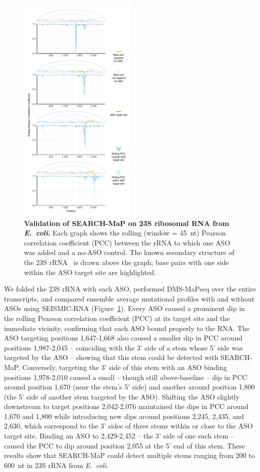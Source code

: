 \documentclass[main.tex]{subfiles}
\begin{document}
\begin{figure}[H]
	\includegraphics[width=0.5\textwidth]{../MainFigures/rrna/rrna.pdf}
	\caption{\textbf{Validation of SEARCH-MaP on 23S ribosomal RNA from \textit{E.~coli}.} Each graph shows the rolling (window = 45~nt) Pearson correlation coefficient (PCC) between the rRNA to which one ASO was added and a no-ASO control. The known secondary structure of the 23S rRNA~\cite{Cannone2002} is drawn above the graph; base pairs with one side within the ASO target site are highlighted.}
	\label{rrna}
\end{figure}

We folded the 23S rRNA with each ASO, performed DMS-MaPseq over the entire transcripts, and compared ensemble average mutational profiles with and without ASOs using SEISMIC-RNA (Figure~\ref{rrna}).
Every ASO caused a prominent dip in the rolling Pearson correlation coefficient (PCC) at its target site and the immediate vicinity, confirming that each ASO bound properly to the RNA.
The ASO targeting positions 1,647-1,668 also caused a smaller dip in PCC around positions 1,987-2,045 -- coinciding with the 3' side of a stem whose 5' side was targeted by the ASO -- showing that this stem could be detected with SEARCH-MaP.
Conversely, targeting the 3' side of this stem with an ASO binding positions 1,978-2,010 caused a small -- though still above-baseline -- dip in PCC around position 1,670 (near the stem's 5' side) and another around position 1,800 (the 5' side of another stem targeted by the ASO).
Shifting the ASO slightly downstream to target positions 2,042-2,076 maintained the dips in PCC around 1,670 and 1,800 while introducing new dips around positions 2,245, 2,435, and 2,630, which correspond to the 3' sides of three stems within or close to the ASO target site.
Binding an ASO to 2,429-2,452 -- the 3' side of one such stem -- caused the PCC to dip around position 2,055 at the 5' end of this stem.
These results show that SEARCH-MaP could detect multiple stems ranging from 200 to 600~nt in 23S rRNA from \textit{E.~coli}.
\end{document}
